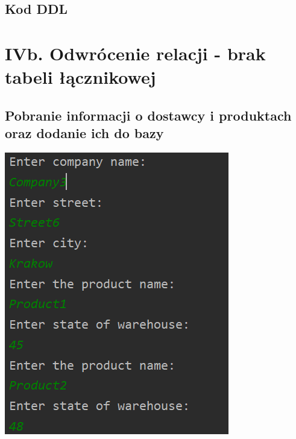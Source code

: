 \documentclass[a4paper, 11pt]{article}
\begin{document}
    \newpage

    \subsection{Kod DDL}
    

    \newpage



    \section{IVb. Odwrócenie relacji - brak tabeli łącznikowej}

    \subsection{Pobranie informacji o dostawcy i produktach oraz dodanie ich do bazy}
    \begin{center}
        \includegraphics[scale=1.3]{images/point4_without_additional_table/addSupplierAndProducts.png}
    \end{center}
\end{document}
